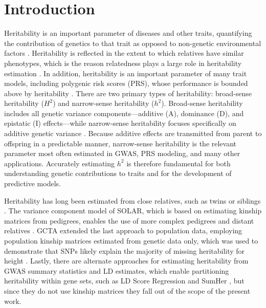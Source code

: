 \documentclass[11pt]{article}
\begin{document}

\clearpage
	
\section{Introduction}

Heritability is an important parameter of diseases and other traits, quantifying the contribution of genetics to that trait as opposed to non-genetic environmental factors \citep{lush1949heritability}. Heritability is reflected in the extent to which relatives have similar phenotypes, which is the reason relatedness plays a large role in heritability estimation \citep{visscher2008heritability}. In addition, heritability is an important parameter of many trait models, including polygenic risk scores (PRS), whose performance is bounded above by heritability \citep{choi2020tutorial}. 
There are two primary types of heritability: broad-sense heritability ($H^2$) and narrow-sense heritability ($h^2$). Broad-sense heritability includes all genetic variance components—additive (A), dominance (D), and epistatic (I) effects—while narrow-sense heritability focuses specifically on additive genetic variance \citep{falconer1996introduction}. Because additive effects are transmitted from parent to offspring in a predictable manner, narrow-sense heritability is the relevant parameter most often estimated in GWAS, PRS modeling, and many other applications. Accurately estimating $h^2$ is therefore fundamental for both understanding genetic contributions to traits and for the development of predictive models.

Heritability has long been estimated from close relatives, such as twins or siblings \citep{falconer1996introduction}. The variance component model of SOLAR, which is based on estimating kinship matrices from pedigrees, enables the use of more complex pedigrees and distant relatives \citep{almasy_multipoint_1998}. GCTA extended the last approach to population data, employing population kinship matrices estimated from genetic data only, which was used to demonstrate that SNPs likely explain the majority of missing heritability for height \citep{yang_common_2010,yang_gcta:_2011}. Lastly, there are alternate approaches for estimating heritability from GWAS summary statistics and LD estimates, which enable partitioning heritability within gene sets, such as LD Score Regression \citep{bulik2015ld,luo2021estimating} and SumHer \citep{speed2019sumher}, but since they do not use kinship matrices they fall out of the scope of the present work. 
\end{document}
